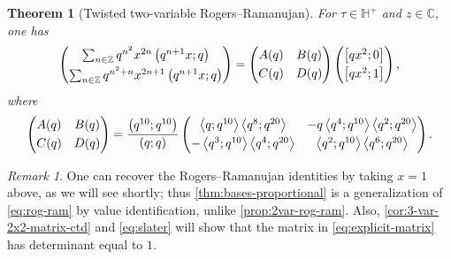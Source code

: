 \documentclass[reqno,11pt]{amsart}
\newtheorem{theorem}{Theorem}[section]
\theoremstyle{definition}
\theoremstyle{remark}
\newtheorem*{remark}{Remark}
\numberwithin{equation}{section}
\newcommand{\Z}{\mathbb{Z}}
\newcommand{\C}{\mathbb{C}}
\renewcommand{\H}{{\mathbb{H}}}
\newcommand{\la}{\left\langle}
\newcommand{\ra}{\right\rangle}
\newcommand{\vect}[2]{\big[{#1};{#2}\big]}
\begin{document}
\begin{theorem}[Twisted two-variable Rogers--Ramanujan]\label{thm:twisted-rog-ram}
For $\tau \in \H^+$ and $z \in \C$, one has
\[
    \begin{pmatrix}
    \sum_{n \in \Z} q^{n^2} x^{2n}  \left( q^{n+1}x; q\right) \vspace{0.1cm} \\ 
    \sum_{n \in \Z} q^{n^2 + n}x^{2n+1}  \left( q^{n+1}x; q\right)
    \end{pmatrix}
    = 
    \begin{pmatrix}
    A(q) & B(q) \vspace{0.1cm}\\
    C(q) & D(q)
    \end{pmatrix}
    \begin{pmatrix}
    \vect{qx^2}{0} \vspace{0.1cm} \\
    \vect{qx^2}{1}
    \end{pmatrix},
\]
where 
\begin{equation} \label{eq:explicit-matrix}
    \begin{pmatrix}
    A(q) & B(q) \vspace{0.1cm}\\
    C(q) & D(q)
    \end{pmatrix}
    =
    \frac{\left(q^{10}; q^{10}\right)}{(q; q)}
    \begin{pmatrix}
    \la q; q^{10}\ra \la q^8; q^{20} \ra 
    &
    -q\la q^4; q^{10} \ra \la q^2; q^{20} \ra 
    \vspace{0.1cm}
    \\
    -\la q^3; q^{10}\ra \la q^4; q^{20} \ra 
    &
    \la q^2; q^{10} \ra \la q^6; q^{20} \ra
    \end{pmatrix}.
\end{equation}
\end{theorem}

\begin{remark}
One can recover the Rogers--Ramanujan identities by taking $x = 1$ above, as we will see shortly; thus \cref{thm:bases-proportional} is a generalization of \cref{eq:rog-ram} by value identification, unlike \cref{prop:2var-rog-ram}.
Also, \cref{cor:3-var-2x2-matrix-ctd} and \cref{eq:slater} will show that the matrix in \cref{eq:explicit-matrix} has determinant equal to $1$. 
\end{remark}
\end{document}
